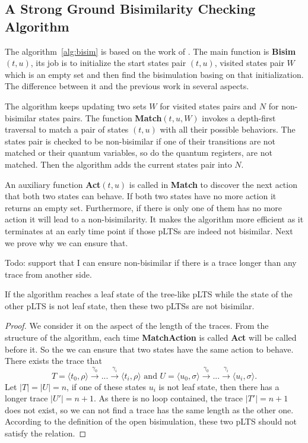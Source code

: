 \documentclass[runningheads]{llncs}
\begin{document}
\subsection{A Strong Ground Bisimilarity Checking Algorithm}
The algorithm~\ref{alg:bisim} is based on the work of \cite{TOCL2014}. The main function is \textbf{Bisim}$(t,u)$, its job is to initialize the start states pair $(t,u)$, visited states pair $W$ which is an empty set and then find the bisimulation basing on that initialization. The difference between it and the previous work in several aspects.

The algorithm keeps updating two sets $W$ for visited states pairs and $N$ for non-bisimilar states pairs. The function \textbf{Match}$(t,u,W)$ invokes a depth-first traversal to match a pair of 
states $(t,u)$ with all their possible behaviors. The states pair is checked to be non-bisimilar if one of their transitions are not matched or their quantum variables, so do the quantum registers, are not matched. Then the algorithm adds the current states pair into $N$. 

An auxiliary function \textbf{Act}$(t,u)$ is called in \textbf{Match} to discover the next action that both two states can behave. If both two states have no more action it returns an empty set. Furthermore, if there is only one of them has no more action it will lead to a non-bisimilarity. It makes the algorithm more efficient as it terminates at an early time point if those pLTSs are indeed not bisimilar. Next we prove why we can ensure that.
\begin{lemma}
Todo: support that I can ensure non-bisimilar if there is a trace longer than any trace from another side.
\end{lemma}
\begin{theorem}
If the algorithm reaches a leaf state of the tree-like pLTS while the state of the other pLTS is not leaf state, then these two pLTSs are not bisimilar.
\end{theorem}
\begin{proof}
We consider it on the aspect of the length of the traces. From the structure of the algorithm, each time \textbf{MatchAction} is called \textbf{Act} will be called before it. So the we can ensure that two states have the same action to behave. There exists the trace that
\[T = \langle t_0,\rho\rangle\xrightarrow{\gamma_0}...\xrightarrow{\gamma_i}\langle t_i,\rho\rangle\text{ and }U = \langle u_0,\sigma\rangle\xrightarrow{\gamma_0}...\xrightarrow{\gamma_i}\langle u_i,\sigma\rangle.\]
Let $|T|=|U|=n$, if one of these states $u_i$ is not leaf state, then there has a longer trace $|U'|=n+1$. As there is no loop contained, the trace $|T'|=n+1$ does not exist, so we can not find a trace has the same length as the other one. According to the definition of the open bisimulation, these two pLTS should not satisfy the relation.
\end{proof}
\end{document}
